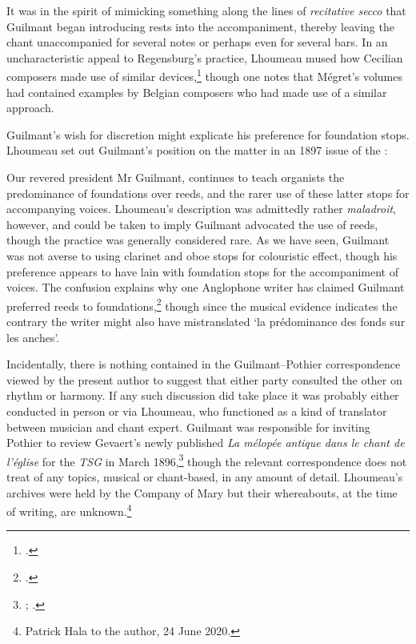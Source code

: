 It was in the spirit of mimicking something along the lines of \emph{recitative secco} that Guilmant began introducing rests into the accompaniment, thereby leaving the chant unaccompanied for several notes or perhaps even for several bars.
In an uncharacteristic appeal to Regensburg's practice, Lhoumeau mused how Cecilian composers made use of similar devices,\footcite[44--5]{LhoumeauEtudeaccompagnement1898} though one notes that Mégret's volumes had contained examples by Belgian composers who had made use of a similar approach.

Guilmant's wish for discretion might explicate his preference for foundation stops.
Lhoumeau set out Guilmant's position on the matter in an 1897 issue of the \tsg{}:

  {\cite[103]{Lhoumeauaccompagnementchantgregorien1897}}
{Our revered president Mr Guilmant, continues to teach organists the predominance of foundations over reeds, and the rarer use of these latter stops for accompanying voices.}
\noindent
Lhoumeau's description was admittedly rather \emph{maladroit}, however, and could be taken to imply Guilmant advocated the use of reeds, though the practice was generally considered rare.
As we have seen, Guilmant was not averse to using clarinet and oboe stops for colouristic effect, though his preference appears to have lain with foundation stops for the \mbox{accompaniment} of voices.
The confusion explains why one Anglophone writer has claimed Guilmant preferred reeds to foundations,\footcite[29--30]{WagstaffGuilmantCredoCatholic2015} though since the musical evidence indicates the contrary the writer might also have mistranslated `la prédominance des fonds sur les anches'.

Incidentally, there is nothing contained in the Guilmant--Pothier correspondence viewed by the present author to suggest that either party consulted the other on rhythm or harmony.
If any such discussion did take place it was probably either conducted in person or via Lhoumeau, who functioned as a kind of translator between musician and chant expert.
Guilmant was responsible for inviting Pothier to review Gevaert's newly published \emph{La mélopée antique dans le chant de l'église} for the \emph{TSG} in March 1896,\footnote{; \cite{PothierReviewmelopeeantique1896}.} though the relevant correspondence does not treat of any topics, musical or chant-based, in any amount of detail.
Lhoumeau's archives were held by the Company of Mary but their whereabouts, at the time of writing, are unknown.\footnote{Patrick Hala to the author, 24 June 2020.}


